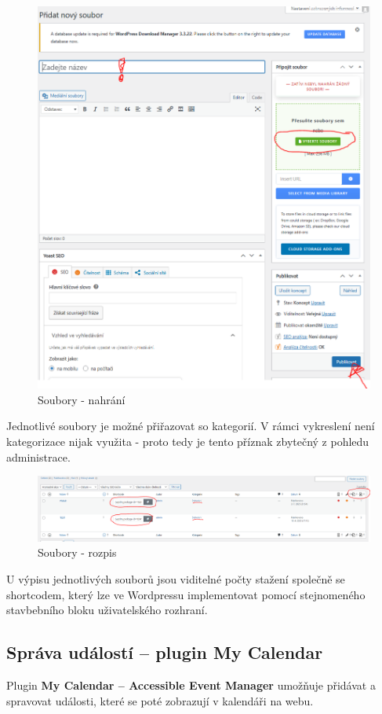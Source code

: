 \documentclass[12pt,a4paper]{article}
\begin{document}
	\newpage
	\begin{figure}[htp]
		\centering
		\includegraphics[width=12cm]{WPupload1.png}
		\caption{Soubory - nahrání}
		\label{fig:role}
	\end{figure}
		
	Jednotlivé soubory je možné přiřazovat so kategorií. V rámci vykreslení není kategorizace nijak využita - proto tedy je tento příznak zbytečný z pohledu administrace.
	
	\begin{figure}[htp]
		\centering
		\includegraphics[width=13cm]{WPupload2.png}
		\caption{Soubory - rozpis}
		\label{fig:role}
	\end{figure}
	
	U výpisu jednotlivých souborů jsou viditelné počty stažení společně se shortcodem, který lze ve Wordpressu implementovat pomocí stejnomeného stavbebního bloku uživatelského rozhraní.
	
		\newpage
	\subsection{Správa událostí – plugin My Calendar}
	Plugin \textbf{My Calendar – Accessible Event Manager} umožňuje přidávat a spravovat události, které se poté zobrazují v kalendáři na webu.
	
\end{document}
